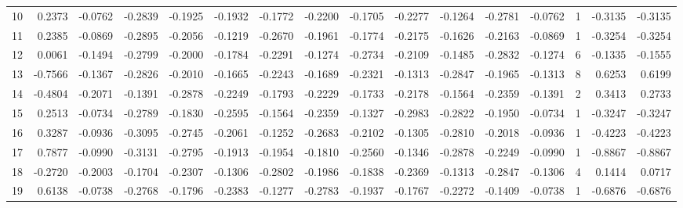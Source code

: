 \begin{tabular}{lrrrrrrrrrrrrrrr}
10 &      0.2373 & -0.0762 & -0.2839 & -0.1925 & -0.1932 & -0.1772 & -0.2200 & -0.1705 & -0.2277 & -0.1264 &  -0.2781 &    -0.0762 &      1 &                   -0.3135 &                    -0.3135 \\
11 &      0.2385 & -0.0869 & -0.2895 & -0.2056 & -0.1219 & -0.2670 & -0.1961 & -0.1774 & -0.2175 & -0.1626 &  -0.2163 &    -0.0869 &      1 &                   -0.3254 &                    -0.3254 \\
12 &      0.0061 & -0.1494 & -0.2799 & -0.2000 & -0.1784 & -0.2291 & -0.1274 & -0.2734 & -0.2109 & -0.1485 &  -0.2832 &    -0.1274 &      6 &                   -0.1335 &                    -0.1555 \\
13 &     -0.7566 & -0.1367 & -0.2826 & -0.2010 & -0.1665 & -0.2243 & -0.1689 & -0.2321 & -0.1313 & -0.2847 &  -0.1965 &    -0.1313 &      8 &                    0.6253 &                     0.6199 \\
14 &     -0.4804 & -0.2071 & -0.1391 & -0.2878 & -0.2249 & -0.1793 & -0.2229 & -0.1733 & -0.2178 & -0.1564 &  -0.2359 &    -0.1391 &      2 &                    0.3413 &                     0.2733 \\
15 &      0.2513 & -0.0734 & -0.2789 & -0.1830 & -0.2595 & -0.1564 & -0.2359 & -0.1327 & -0.2983 & -0.2822 &  -0.1950 &    -0.0734 &      1 &                   -0.3247 &                    -0.3247 \\
16 &      0.3287 & -0.0936 & -0.3095 & -0.2745 & -0.2061 & -0.1252 & -0.2683 & -0.2102 & -0.1305 & -0.2810 &  -0.2018 &    -0.0936 &      1 &                   -0.4223 &                    -0.4223 \\
17 &      0.7877 & -0.0990 & -0.3131 & -0.2795 & -0.1913 & -0.1954 & -0.1810 & -0.2560 & -0.1346 & -0.2878 &  -0.2249 &    -0.0990 &      1 &                   -0.8867 &                    -0.8867 \\
18 &     -0.2720 & -0.2003 & -0.1704 & -0.2307 & -0.1306 & -0.2802 & -0.1986 & -0.1838 & -0.2369 & -0.1313 &  -0.2847 &    -0.1306 &      4 &                    0.1414 &                     0.0717 \\
19 &      0.6138 & -0.0738 & -0.2768 & -0.1796 & -0.2383 & -0.1277 & -0.2783 & -0.1937 & -0.1767 & -0.2272 &  -0.1409 &    -0.0738 &      1 &                   -0.6876 &                    -0.6876 \\
\bottomrule
\end{tabular}
